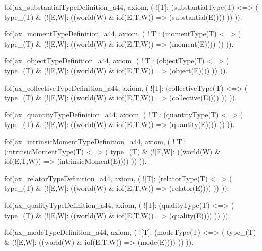 fof(ax_substantialTypeDefinition_a44, axiom, (
  ![T]: (substantialType(T) <=> (
    type_(T) & (![E,W]: ((world(W) & iof(E,T,W)) => (substantial(E))))
  ))
)).

fof(ax_momentTypeDefinition_a44, axiom, (
  ![T]: (momentType(T) <=> (
    type_(T) & (![E,W]: ((world(W) & iof(E,T,W)) => (moment(E))))
  ))
)).

fof(ax_objectTypeDefinition_a44, axiom, (
  ![T]: (objectType(T) <=> (
    type_(T) & (![E,W]: ((world(W) & iof(E,T,W)) => (object(E))))
  ))
)).

fof(ax_collectiveTypeDefinition_a44, axiom, (
  ![T]: (collectiveType(T) <=> (
    type_(T) & (![E,W]: ((world(W) & iof(E,T,W)) => (collective(E))))
  ))
)).

fof(ax_quantityTypeDefinition_a44, axiom, (
  ![T]: (quantityType(T) <=> (
    type_(T) & (![E,W]: ((world(W) & iof(E,T,W)) => (quantity(E))))
  ))
)).

fof(ax_intrinsicMomentTypeDefinition_a44, axiom, (
  ![T]: (intrinsicMomentType(T) <=> (
    type_(T) & (![E,W]: ((world(W) & iof(E,T,W)) => (intrinsicMoment(E))))
  ))
)).

fof(ax_relatorTypeDefinition_a44, axiom, (
  ![T]: (relatorType(T) <=> (
    type_(T) & (![E,W]: ((world(W) & iof(E,T,W)) => (relator(E))))
  ))
)).

fof(ax_qualityTypeDefinition_a44, axiom, (
  ![T]: (qualityType(T) <=> (
    type_(T) & (![E,W]: ((world(W) & iof(E,T,W)) => (quality(E))))
  ))
)).

fof(ax_modeTypeDefinition_a44, axiom, (
  ![T]: (modeType(T) <=> (
    type_(T) & (![E,W]: ((world(W) & iof(E,T,W)) => (mode(E))))
  ))
)).



  

